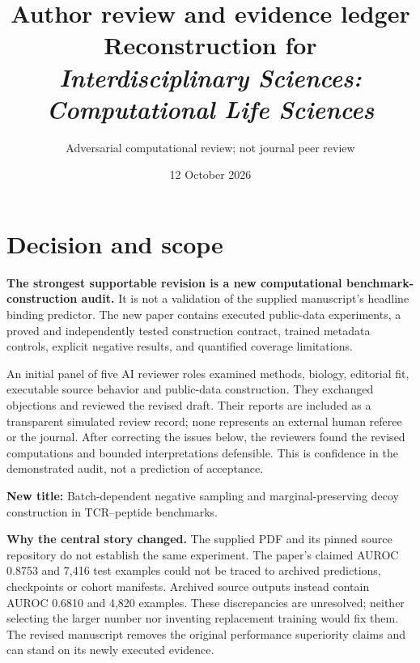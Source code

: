 \documentclass[11pt,a4paper]{article}
\title{Author review and evidence ledger\\\large Reconstruction for \textit{Interdisciplinary Sciences: Computational Life Sciences}}
\author{Adversarial computational review; not journal peer review}
\date{12 October 2026}
\begin{document}
\maketitle
\section{Decision and scope}
\textbf{The strongest supportable revision is a new computational benchmark-construction audit.} It is not a validation of the supplied manuscript's headline binding predictor. The new paper contains executed public-data experiments, a proved and independently tested construction contract, trained metadata controls, explicit negative results, and quantified coverage limitations.

An initial panel of five AI reviewer roles examined methods, biology, editorial fit, executable source behavior and public-data construction. They exchanged objections and reviewed the revised draft. Their reports are included as a transparent simulated review record; none represents an external human referee or the journal. After correcting the issues below, the reviewers found the revised computations and bounded interpretations defensible. This is confidence in the demonstrated audit, not a prediction of acceptance.

\textbf{New title:} Batch-dependent negative sampling and marginal-preserving decoy construction in TCR--peptide benchmarks.

\textbf{Why the central story changed.} The supplied PDF and its pinned source repository do not establish the same experiment. The paper's claimed AUROC 0.8753 and 7,416 test examples could not be traced to archived predictions, checkpoints or cohort manifests. Archived source outputs instead contain AUROC 0.6810 and 4,820 examples. These discrepancies are unresolved; neither selecting the larger number nor inventing replacement training would fix them. The revised manuscript removes the original performance superiority claims and can stand on its newly executed evidence.
\end{document}
